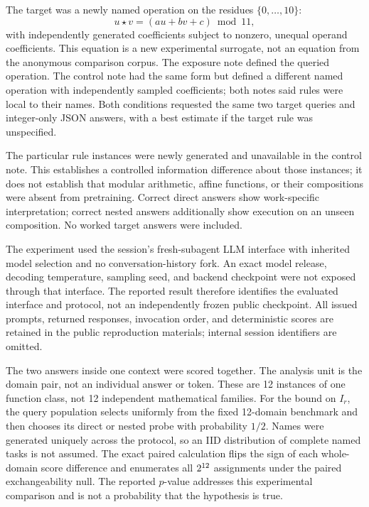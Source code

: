 \documentclass[11pt,letterpaper]{article}
\theoremstyle{definition}\newtheorem{definition}[theorem]{Definition}
\begin{document}
The target was a newly named operation on the residues $\{0,\ldots,10\}$:
\begin{equation}
u\star v=(au+bv+c)\bmod11,
\label{eq:pilotrule}
\end{equation}
with independently generated coefficients subject to nonzero, unequal operand coefficients. This equation is a new experimental surrogate, not an equation from the anonymous comparison corpus. The exposure note defined the queried operation. The control note had the same form but defined a different named operation with independently sampled coefficients; both notes said rules were local to their names. Both conditions requested the same two target queries and integer-only JSON answers, with a best estimate if the target rule was unspecified.

The particular rule instances were newly generated and unavailable in the control note. This establishes a controlled information difference about those instances; it does not establish that modular arithmetic, affine functions, or their compositions were absent from pretraining. Correct direct answers show work-specific interpretation; correct nested answers additionally show execution on an unseen composition. No worked target answers were included.

The experiment used the session's fresh-subagent LLM interface with inherited model selection and no conversation-history fork. An exact model release, decoding temperature, sampling seed, and backend checkpoint were not exposed through that interface. The reported result therefore identifies the evaluated interface and protocol, not an independently frozen public checkpoint. All issued prompts, returned responses, invocation order, and deterministic scores are retained in the public reproduction materials; internal session identifiers are omitted.



The two answers inside one context were scored together. The analysis unit is the domain pair, not an individual answer or token. These are 12 instances of one function class, not 12 independent mathematical families. For the bound on $I_r$, the query population selects uniformly from the fixed 12-domain benchmark and then chooses its direct or nested probe with probability $1/2$. Names were generated uniquely across the protocol, so an IID distribution of complete named tasks is not assumed. The exact paired calculation flips the sign of each whole-domain score difference and enumerates all $2^{12}$ assignments under the paired exchangeability null. The reported $p$-value addresses this experimental comparison and is not a probability that the hypothesis is true.
\end{document}

